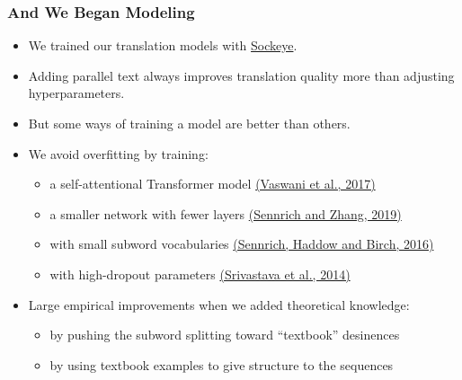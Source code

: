 \documentclass{beamer}
\begin{document}

\begin{frame}
  \frametitle{And We Began Modeling}
  \begin{itemize}
  \item We trained our translation models with \href{https://awslabs.github.io/sockeye/}{Sockeye}.
  \vspace{0.25em}
  \item Adding parallel text always improves translation quality more than adjusting hyperparameters.
  \vspace{0.25em}
  \item But some ways of training a model are better than others.
  \vspace{0.25em}
  \item We avoid overfitting by training:
    \begin{itemize}
    \item a self-attentional Transformer model \href{https://arxiv.org/abs/1706.03762}{(Vaswani et al., 2017)}%
    \item a smaller network with fewer layers \href{https://arxiv.org/abs/1905.11901}{(Sennrich and Zhang, 2019)}
    \item with small subword vocabularies \href{https://arxiv.org/abs/1508.07909}{(Sennrich, Haddow and Birch, 2016)}
    \item with high-dropout parameters \href{http://jmlr.org/papers/v15/srivastava14a.html}{(Srivastava et al., 2014)}
    \end{itemize}
  \vspace{0.25em}
  \item Large empirical improvements when we added theoretical knowledge:
    \begin{itemize}
    \item by pushing the subword splitting toward ``textbook'' desinences
    \item by using textbook examples to give structure to the sequences
    \end{itemize}
  \end{itemize}
\end{frame}

\end{document}
